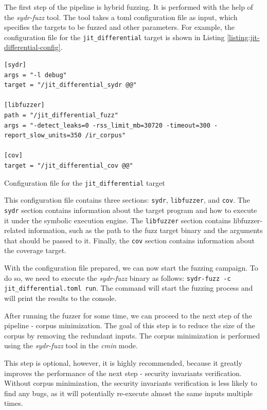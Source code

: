 The first step of the pipeline is hybrid fuzzing. It is performed with the help of the \textit{sydr-fuzz} tool. The tool takes a toml configuration file as input, which specifies the targets to be fuzzed and other parameters. For example, the configuration file for the \texttt{jit\_differential} target is shown in Listing \ref{listing:jit-differential-config}.

\begin{listing}[h]
    \centering
    \begin{minipage}{.75\linewidth}
        \begin{verbatim}
[sydr]
args = "-l debug"
target = "/jit_differential_sydr @@"

[libfuzzer]
path = "/jit_differential_fuzz"
args = "-detect_leaks=0 -rss_limit_mb=30720 -timeout=300 -report_slow_units=350 /ir_corpus"

[cov]
target = "/jit_differential_cov @@"
\end{verbatim}
    \end{minipage}
    \caption{Configuration file for the \texttt{jit\_differential} target}
    \label{listing:jit-differential-config}
\end{listing}

This configuration file contains three sections: \texttt{sydr}, \texttt{libfuzzer}, and \texttt{cov}. The \texttt{sydr} section contains information about the target program and how to execute it under the symbolic execution engine. The \texttt{libfuzzer} section contains libfuzzer-related information, such as the path to the fuzz target binary and the arguments that should be passed to it. Finally, the \texttt{cov} section contains information about the coverage target.

With the configuration file prepared, we can now start the fuzzing campaign. To do so, we need to execute the \textit{sydr-fuzz} binary as follows: \texttt{sydr-fuzz -c jit\_differential.toml run}. The command will start the fuzzing process and will print the results to the console.


After running the fuzzer for some time, we can proceed to the next step of the pipeline - corpus minimization. The goal of this step is to reduce the size of the corpus by removing the redundant inputs. The corpus minimization is performed using the \textit{sydr-fuzz} tool in the \textit{cmin} mode.

This step is optional, however, it is highly recommended, because it greatly improves the performance of the next step - security invariants verification. Without corpus minimization, the security invariants verification is less likely to find any bugs, as it will potentially re-execute almost the same inputs multiple times.

